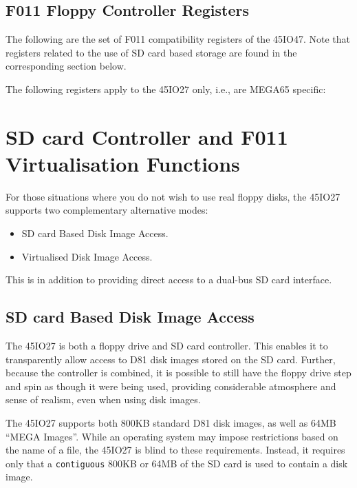 \subsection{F011 Floppy Controller Registers}

The following are the set of F011 compatibility registers of the 45IO47.
Note that registers related to the use of SD card based storage are found in the corresponding section below.



The following registers apply to the 45IO27 only, i.e., are MEGA65 specific:



\section{SD card Controller and F011 Virtualisation Functions}

For those situations where you do not wish to use real floppy disks,
the 45IO27 supports two complementary alternative modes:

\begin{itemize}
\item SD card Based Disk Image Access.
\item Virtualised Disk Image Access.
\end{itemize}

This is in addition to providing direct access to a dual-bus SD card
interface.

\subsection{SD card Based Disk Image Access}

The 45IO27 is both a floppy drive and SD card controller.
This enables it to transparently allow access to D81 disk images
stored on the SD card.  Further, because the controller is combined,
it is possible to still have the floppy drive step and spin as though
it were being used, providing considerable atmosphere and sense of
realism, even when using disk images.

The 45IO27 supports both 800KB standard D81 disk images, as well as
64MB ``MEGA Images''.  While an operating system may impose
restrictions based on the name of a file, the 45IO27 is blind to these
requirements. Instead, it requires only that a {\tt contiguous} 800KB
or 64MB of the SD card is used to contain a disk image.

